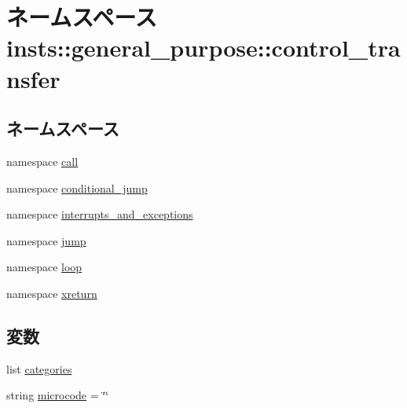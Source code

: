 \hypertarget{namespaceinsts_1_1general__purpose_1_1control__transfer}{
\section{ネームスペース insts::general\_\-purpose::control\_\-transfer}
\label{namespaceinsts_1_1general__purpose_1_1control__transfer}
}
\subsection*{ネームスペース}
\begin{DoxyCompactItemize}
\item 
namespace \hyperlink{namespaceinsts_1_1general__purpose_1_1control__transfer_1_1call}{call}
\item 
namespace \hyperlink{namespaceinsts_1_1general__purpose_1_1control__transfer_1_1conditional__jump}{conditional\_\-jump}
\item 
namespace \hyperlink{namespaceinsts_1_1general__purpose_1_1control__transfer_1_1interrupts__and__exceptions}{interrupts\_\-and\_\-exceptions}
\item 
namespace \hyperlink{namespaceinsts_1_1general__purpose_1_1control__transfer_1_1jump}{jump}
\item 
namespace \hyperlink{namespaceinsts_1_1general__purpose_1_1control__transfer_1_1loop}{loop}
\item 
namespace \hyperlink{namespaceinsts_1_1general__purpose_1_1control__transfer_1_1xreturn}{xreturn}
\end{DoxyCompactItemize}
\subsection*{変数}
\begin{DoxyCompactItemize}
\item 
list \hyperlink{namespaceinsts_1_1general__purpose_1_1control__transfer_a273cf0f1630af14c1582f05e53354a55}{categories}
\item 
string \hyperlink{namespaceinsts_1_1general__purpose_1_1control__transfer_a770f11a173e99389a8802f0107ed8f52}{microcode} = \char`\"{}\char`\"{}
\end{DoxyCompactItemize}


